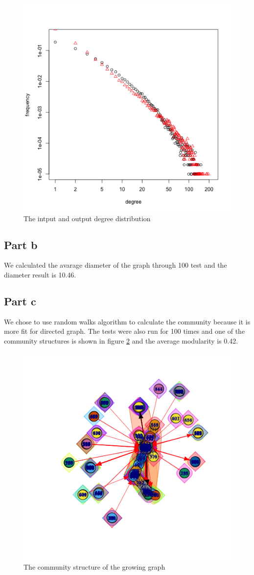 \documentclass{article}
\begin{document}
\begin{figure}[htbp]
\centering
\includegraphics[width=.6\textwidth]{in_out.png}
\caption{The intput and output degree distribution}
\label{fig:inout}
\end{figure}
\subsection{Part b}
We calculated the avarage diameter of the graph through 100 test and the diameter result is 10.46.
\subsection{Part c}
We chose to use random walks algorithm to calculate the community because it is more fit for directed graph. The tests were also run for 100 times and one of the community structures is shown in figure \ref{fig:com} and the average modularity is 0.42.
\begin{figure}[htbp]
\centering
\includegraphics[width=.8\textwidth]{p4.png}
\caption{The community structure of the growing graph}
\label{fig:com}
\end{figure}
\end{document}
